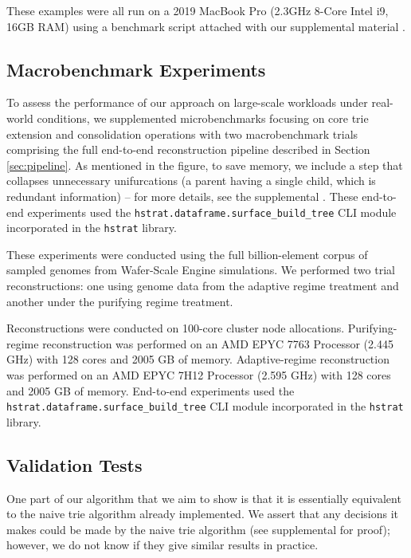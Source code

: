 These examples were all run on a 2019 MacBook Pro (2.3GHz 8-Core Intel i9, 16GB RAM) using a benchmark script attached with our supplemental material \citep{supplemental}.

\subsection{Macrobenchmark Experiments}

To assess the performance of our approach on large-scale workloads under real-world conditions, we supplemented microbenchmarks focusing on core trie extension and consolidation operations with two macrobenchmark trials comprising the full end-to-end reconstruction pipeline described in Section \ref{sec:pipeline}.
As mentioned in the figure, to save memory, we include a step that collapses unnecessary unifurcations (a parent having a single child, which is redundant information) -- for more details, see the supplemental \citep{supplemental}.
These end-to-end experiments used the \texttt{hstrat.dataframe.surface\_build\_tree} CLI module incorporated in the \texttt{hstrat} library.

These experiments were conducted using the full billion-element corpus of sampled genomes from Wafer-Scale Engine simulations.
We performed two trial reconstructions: one using genome data from the adaptive regime treatment and another under the purifying regime treatment.

Reconstructions were conducted on 100-core cluster node allocations.
Purifying-regime reconstruction was performed on an AMD EPYC 7763 Processor (2.445 GHz) with 128 cores and 2005 GB of memory.
Adaptive-regime reconstruction was performed on an AMD EPYC 7H12 Processor (2.595 GHz) with 128 cores and 2005 GB of memory.
End-to-end experiments used the \texttt{hstrat.dataframe.surface\_build\_tree} CLI module incorporated in the \texttt{hstrat} library.

\subsection{Validation Tests}

One part of our algorithm that we aim to show is that it is essentially equivalent to the naive trie algorithm already implemented.
We assert that any decisions it makes could be made by the naive trie algorithm (see supplemental \citep{supplemental} for proof); however, we do not know if they give similar results in practice.

